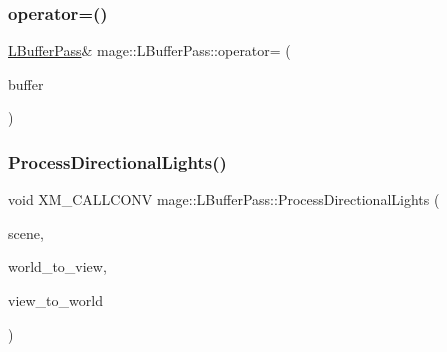 \hypertarget{structmage_1_1_l_buffer_pass_a3e4405a5af87c2c6f4839cb8502aa5de}{}\label{structmage_1_1_l_buffer_pass_a3e4405a5af87c2c6f4839cb8502aa5de} 
\subsubsection{\texorpdfstring{operator=()}{operator=()}\hspace{0.1cm}{\footnotesize\ttfamily [2/2]}}
{\footnotesize\ttfamily \hyperlink{structmage_1_1_l_buffer_pass}{L\+Buffer\+Pass}\& mage\+::\+L\+Buffer\+Pass\+::operator= (\begin{DoxyParamCaption}\item[{\hyperlink{structmage_1_1_l_buffer_pass}{L\+Buffer\+Pass} \&\&}]{buffer }\end{DoxyParamCaption})\hspace{0.3cm}{\ttfamily [delete]}}

\hypertarget{structmage_1_1_l_buffer_pass_a731613105a25fbae8560954e1b3b78fe}{}\label{structmage_1_1_l_buffer_pass_a731613105a25fbae8560954e1b3b78fe} 
\subsubsection{\texorpdfstring{Process\+Directional\+Lights()}{ProcessDirectionalLights()}}
{\footnotesize\ttfamily void X\+M\+\_\+\+C\+A\+L\+L\+C\+O\+NV mage\+::\+L\+Buffer\+Pass\+::\+Process\+Directional\+Lights (\begin{DoxyParamCaption}\item[{const \hyperlink{classmage_1_1_scene}{Scene} \&}]{scene,  }\item[{F\+X\+M\+M\+A\+T\+R\+IX}]{world\+\_\+to\+\_\+view,  }\item[{C\+X\+M\+M\+A\+T\+R\+IX}]{view\+\_\+to\+\_\+world }\end{DoxyParamCaption})\hspace{0.3cm}{\ttfamily [private]}}

\hypertarget{structmage_1_1_l_buffer_pass_a5da38ff4cf2d1de37fb40f8923b1d9bf}{}\label{structmage_1_1_l_buffer_pass_a5da38ff4cf2d1de37fb40f8923b1d9bf} 
